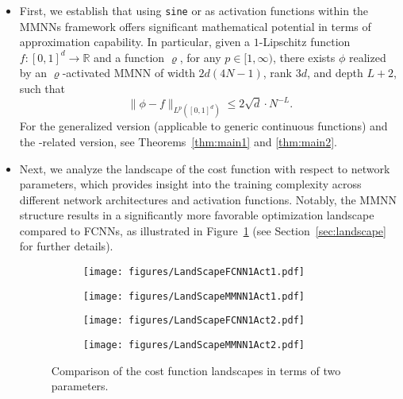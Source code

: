 \documentclass[11pt,a4paper]{article}
\begin{document}
\begin{itemize}
\item First, we establish that using \texttt{sine} or  as activation functions within the MMNNs framework offers significant mathematical potential in terms of approximation capability.
In particular, given a $1$-Lipschitz function $f:[0,1]^d\to \mathbb{R}$ and a \SinTU{} function $\varrho$, for any $p \in [1,\infty)$, there exists   $\phi$ realized by an $\varrho$-activated MMNN of width $2d(4N-1)$, rank $3d$, and depth $L+2$, such that
\[
\| \phi - f\|_{L^p([0,1]^d)} \leq  2\sqrt{d} \cdot N^{-L}.
\]
For the generalized version (applicable to generic continuous functions) and the \sine-related version, see Theorems~\ref{thm:main1} and \ref{thm:main2}.








\item Next, we analyze the landscape of the cost function with respect to network parameters, which provides insight into the training complexity across different network architectures and activation functions. Notably, the MMNN structure results in a significantly more favorable optimization landscape compared to FCNNs, as illustrated in Figure~\ref{fig:landscape:intro:v} (see Section~\ref{sec:landscape} for further details).

\begin{figure}[ht]%
            \centering
            \begin{subfigure}[b]{0.242046\textwidth}
                    \centering            
                    \texttt{[image: figures/LandScapeFCNN1Act1.pdf]}
                \end{subfigure}
                \hfill
            \begin{subfigure}[b]{0.242046\textwidth}
                    \centering            \texttt{[image: figures/LandScapeMMNN1Act1.pdf]}
                \end{subfigure}
\hfill
                \begin{subfigure}[b]{0.24207300245\textwidth}
                    \centering            
                    \texttt{[image: figures/LandScapeFCNN1Act2.pdf]}
                \end{subfigure}
                \hfill
            \begin{subfigure}[b]{0.242\textwidth}
                    \centering            \texttt{[image: figures/LandScapeMMNN1Act2.pdf]}
                \end{subfigure}             
                \caption{Comparison of the cost function landscapes in terms of two parameters.
                }
\label{fig:landscape:intro:v}
\end{figure}


\end{itemize}
\end{document}
